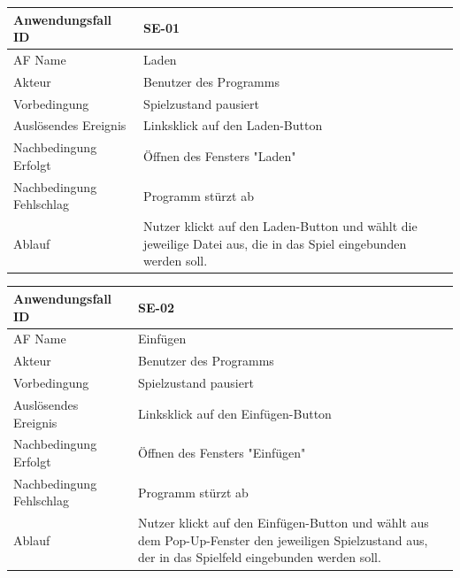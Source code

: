 \documentclass[11pt,a4paper]{article}
\begin{document}
    
    \begin{tabular}[m]{|m{7cm}|m{9cm}|}
        \hline
        Anwendungsfall ID     & SE-01 \\ %
        \hline
        AF Name     &  Laden \\
        \hline
        Akteur &  Benutzer des Programms \\
        \hline
        Vorbedingung & Spielzustand pausiert\\
        \hline
        Auslösendes Ereignis & Linksklick auf den Laden-Button\\
        \hline
        Nachbedingung Erfolgt & Öffnen des Fensters "Laden"\\
        \hline
        Nachbedingung Fehlschlag & Programm stürzt ab\\
        \hline
        Ablauf & Nutzer klickt auf den Laden-Button und wählt die jeweilige Datei aus, die in das Spiel eingebunden werden soll.\\
        \hline
    \end{tabular}
    \par
    
    
        \begin{tabular}[m]{|m{7cm}|m{9cm}|}
        \hline
        Anwendungsfall ID     & SE-02 \\ %
        \hline
        AF Name     &  Einfügen \\
        \hline
        Akteur&Benutzer des Programms \\
        \hline
        Vorbedingung & Spielzustand pausiert\\
        \hline
        Auslösendes Ereignis & Linksklick auf den Einfügen-Button\\
        \hline
        Nachbedingung Erfolgt&Öffnen des Fensters "Einfügen"\\
        \hline
        Nachbedingung Fehlschlag&Programm stürzt ab\\
        \hline
        Ablauf&Nutzer klickt auf den Einfügen-Button und wählt aus dem Pop-Up-Fenster den jeweiligen Spielzustand aus, der in das Spielfeld eingebunden werden soll.\\
        \hline
    \end{tabular}
    \par
    
\end{document}
